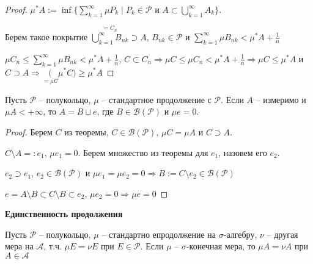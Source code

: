 \begin{proof}
    $\mu^* A:=\inf \{\sum\limits_{k=1}^\infty \mu P_k\mid P_k\in \mathcal{P}\text{ и } A\subset \bigcup\limits_{k=1}^\infty A_k\}$.

    Берем такое покрытие $\overset{=C_n}{\bigcup\limits_{k=1}^\infty B_{nk}}\supset A$, $B_{nk}\in\mathcal{P}$ и $\sum\limits_{k=1}^\infty \mu B_{nk}<\mu^*A +\frac{1}{n}$

    $\mu C_n\leq \sum\limits_{k=1}^\infty \mu B_{nk}<\mu^*A +\frac{1}{n}$, $C\subset C_n\Rightarrow \mu C \leq \mu C_n < \mu^*A +\frac{1}{n}\Rightarrow
    \mu C \leq \mu^* A$ и $C\supset A\Rightarrow \underset{=\mu C}(\mu^* C)\geq \mu^* A$
\end{proof}

\begin{corollary}
    Пусть $\mathcal{P}$ – полукольцо, $\mu$ – стандартное продолжение с $\mathcal{P}$. Если $A$ – 
    измеримо и $\mu A<+\infty$, то $A=B\sqcup e$, где $B\in \mathcal{B}(\mathcal{P})$ и $\mu e = 0$.
\end{corollary}

\begin{proof}
    Берем $C$ из теоремы, $C\in\mathcal{B}(\mathcal{P})$, $\mu C=\mu A$ и $C\supset A$.

    $C\setminus A=:e_1$, $\mu e_1 = 0$. Берем множество из теоремы для $e_1$, назовем его $e_2$.

    $e_2\supset e_1$, $e_2\in \mathcal{B}(\mathcal{P})$ и $\mu e_1=\mu e_2=0\Rightarrow B:= C\setminus e_2\in \mathcal{B}(\mathcal{P})$

    $e=A\setminus B \subset C \setminus B \subset e_2$, $\mu e_2=0\Rightarrow\mu e=0$
\end{proof}

\begin{theorem}
    \textbf{Единственность продолжения}

    Пусть $\mathcal{P}$ – полукольцо, $\mu$ – стандартно епродолжение на $\sigma$-алгебру, $\nu$ – другая мера на $\mathcal{A}$,
    т.ч. $\mu E = \nu E$ при $E\in \mathcal{P}$. Если $\mu$ – $\sigma$-конечная мера, то $\mu A = \nu A$ при $A\in \mathcal{A}$
\end{theorem}

